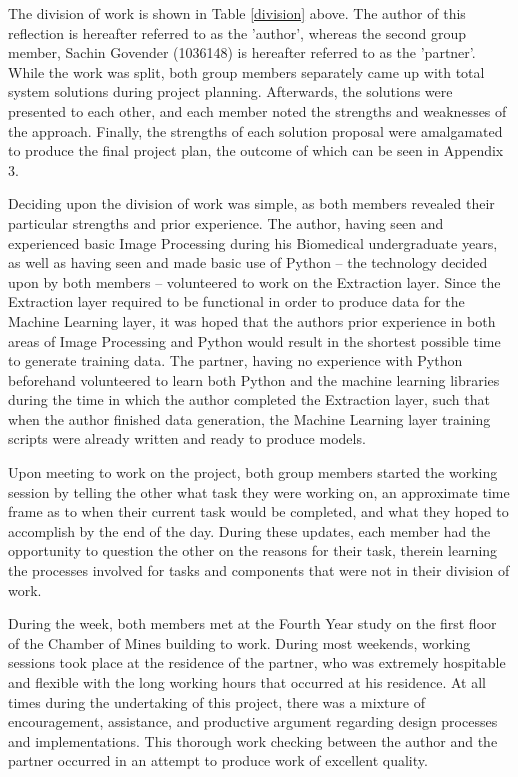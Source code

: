 \documentclass[conference]{IEEEtran}
\begin{document}


The division of work is shown in Table \ref{division} above.
The author of this reflection is hereafter referred to as the 'author', whereas the second group member, Sachin Govender (1036148) is hereafter referred to as the 'partner'.
While the work was split, both group members separately came up with total system solutions during project planning.
Afterwards, the solutions were presented to each other, and each member noted the strengths and weaknesses of the approach.
Finally, the strengths of each solution proposal were amalgamated to produce the final project plan, the outcome of which can be seen in Appendix 3.

Deciding upon the division of work was simple, as both members revealed their particular strengths and prior experience.
The author, having seen and experienced basic Image Processing during his Biomedical undergraduate years, as well as having seen and made basic use of Python -- the technology decided upon by both members -- volunteered to work on the Extraction layer.
Since the Extraction layer required to be functional in order to produce data for the Machine Learning layer, it was hoped that the authors prior experience in both areas of Image Processing and Python would result in the shortest possible time to generate training data.
The partner, having no experience with Python beforehand volunteered to learn both Python and the machine learning libraries during the time in which the author completed the Extraction layer, such that when the author finished data generation, the Machine Learning layer training scripts were already written and ready to produce models.

Upon meeting to work on the project, both group members started the working session by telling the other what task they were working on, an approximate time frame as to when their current task would be completed, and what they hoped to accomplish by the end of the day.
During these updates, each member had the opportunity to question the other on the reasons for their task, therein learning the processes involved for tasks and components that were not in their division of work.

During the week, both members met at the Fourth Year study on the first floor of the Chamber of Mines building to work.
During most weekends, working sessions took place at the residence of the partner, who was extremely hospitable and flexible with the long working hours that occurred at his residence.
At all times during the undertaking of this project, there was a mixture of encouragement, assistance, and productive argument regarding design processes and implementations.
This thorough work checking between the author and the partner occurred in an attempt to produce work of excellent quality.
\end{document}
